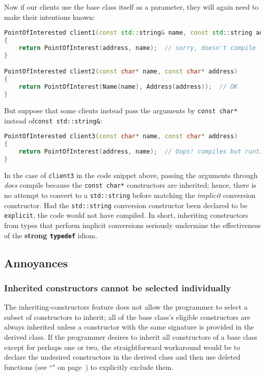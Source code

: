 \noindent Now if our clients use the base class itself as a parameter, they will
again need to make their intentions known:

\begin{lstlisting}[language=C++]
PointOfInterested client1(const std::string& name, const std::string address)
{
    return PointOfInterest(address, name);  // sorry, doesn't compile
}

PointOfInterested client2(const char* name, const char* address)
{
    return PointOfInterest(Name(name), Address(address));  // OK
}
\end{lstlisting}
    
\noindent But suppose that some clients instead pass the arguments by
\texttt{const}~\texttt{char*} instead of\linebreak[4]
\mbox{\texttt{const}~\texttt{std::string\&}}:

\begin{lstlisting}[language=C++]
PointOfInterested client3(const char* name, const char* address)
{
    return PointOfInterest(address, name);  // Oops! compiles but runtime error
}
\end{lstlisting}
    
\noindent In the case of \texttt{client3} in the code snippet above, passing the arguments through
\emph{does} compile because the \texttt{const}~\texttt{char*}
constructors are inherited; hence, there is no attempt to convert
to a \texttt{std::string} before matching the \emph{implicit} conversion
constructor. Had the \texttt{std::string} conversion
constructor been declared to be \texttt{explicit}, the code would not
have compiled. In short, inheriting constructors from types that perform implicit
conversions seriously undermine the effectiveness of the \textbf{strong
\texttt{typedef}} idiom.

\subsection[Annoyances]{Annoyances}\label{annoyances-inheritingctor}

\subsubsection[Inherited constructors cannot be selected individually]{Inherited constructors cannot be selected individually}\label{inherited-constructors-cannot-be-selected-individually}

The inheriting-constructors feature does not allow the programmer
to select a subset of constructors to inherit; all of the base
class's eligible constructors are always inherited unless a constructor
with the same signature is provided in the derived class. If the
programmer desires to inherit all constructors of a base class except
for perhaps one or two, the straightforward workaround would be to
declare the undesired constructors in the derived class and then use
deleted functions (see ``" on page~\pageref{deleted-functions}) to explicitly exclude them.

